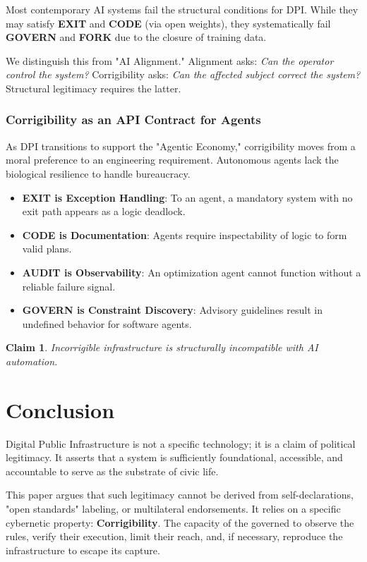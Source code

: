 \documentclass{article}
\newtheorem{claim}{Claim}
\begin{document}
Most contemporary AI systems fail the structural conditions for DPI. While they may satisfy \textbf{EXIT} and \textbf{CODE} (via open weights), they systematically fail \textbf{GOVERN} and \textbf{FORK} due to the closure of training data.

We distinguish this from "AI Alignment." Alignment asks: \textit{Can the operator control the system?} Corrigibility asks: \textit{Can the affected subject correct the system?} Structural legitimacy requires the latter.

\subsubsection{Corrigibility as an API Contract for Agents}
As DPI transitions to support the "Agentic Economy," corrigibility moves from a moral preference to an engineering requirement. Autonomous agents lack the biological resilience to handle bureaucracy.
\begin{itemize}
    \item \textbf{EXIT is Exception Handling}: To an agent, a mandatory system with no exit path appears as a logic deadlock.
    \item \textbf{CODE is Documentation}: Agents require inspectability of logic to form valid plans.
    \item \textbf{AUDIT is Observability}: An optimization agent cannot function without a reliable failure signal.
    \item \textbf{GOVERN is Constraint Discovery}: Advisory guidelines result in undefined behavior for software agents.
\end{itemize}
\begin{claim}
Incorrigible infrastructure is structurally incompatible with AI automation.
\end{claim}

\section{Conclusion}

Digital Public Infrastructure is not a specific technology; it is a claim of political legitimacy. It asserts that a system is sufficiently foundational, accessible, and accountable to serve as the substrate of civic life.

This paper argues that such legitimacy cannot be derived from self-declarations, "open standards" labeling, or multilateral endorsements. It relies on a specific cybernetic property: \textbf{Corrigibility}. The capacity of the governed to observe the rules, verify their execution, limit their reach, and, if necessary, reproduce the infrastructure to escape its capture.
\end{document}

